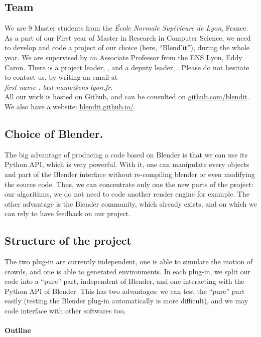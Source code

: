 \subsection{Team}

We are 9 Master students from the \textit{École Normale Supérieure de
Lyon}, France. As a part of our First year of Master in Research in
Computer Science, we need to develop and code a project of our choice
(here, ``Blend'it''), during the whole year. We are supervised by an
Associate Professor from the ENS Lyon, Eddy Caron. There is a project
leader, \me, and a deputy leader, \mr. Please do not hesitate to
contact us, by writing an email at \\
\textit{first name . last name@ens-lyon.fr}.\\

All our work is hosted on Github, and can be consulted on
\url{github.com/blendit}. We also have a website:
\url{blendit.github.io/}.


\subsection{Choice of Blender.}

The big advantage of producing a code based on Blender is that we can
use its Python API, which is very powerful. With it, one can
manipulate every objects and part of the Blender interface without
re-compiling blender or even modifying the source code. Thus, we can
concentrate only one the new parts of the project: our algorithms, we
do not need to code another render engine for example.  The other
advantage is the Blender community, which already exists, and on which
we can rely to have feedback on our project.


\subsection{Structure of the project}

The two plug-in are currently independent, one is able to simulate the
motion of crowds, and one is able to generated environments. In each
plug-in, we split our code into a ``pure'' part, independent of
Blender, and one interacting with the Python API of Blender. This has
two advantages: we can test the ``pure'' part easily (testing the
Blender plug-in automatically is more difficult), and we may code
interface with other softwares too.



\paragraph{Outline}

